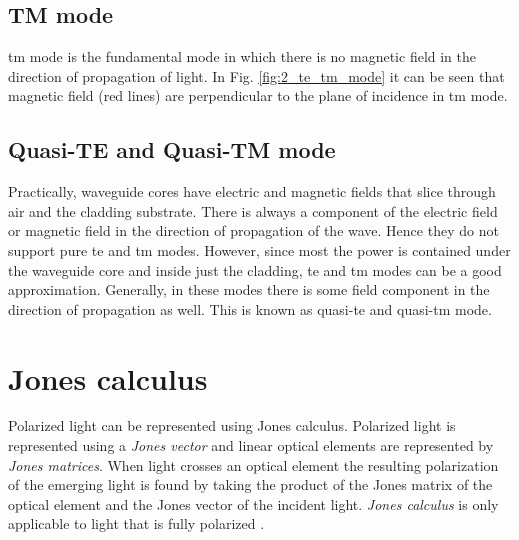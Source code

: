 \documentclass[../report.tex]{subfiles}
\begin{document}
	\subsection{TM mode}
	\gls{tm} mode is the fundamental mode in which there is no magnetic field in the direction of propagation of light. In Fig. \ref{fig:2_te_tm_mode} it can be seen that magnetic field (red lines) are perpendicular to the plane of incidence in \gls{tm} mode.
	
	\subsection{Quasi-TE and Quasi-TM mode}				
	Practically, waveguide cores have electric and magnetic fields that slice through air and the cladding substrate. There is always a component of the electric field or magnetic field in the direction of propagation of the wave. Hence they do not support pure \gls{te} and \gls{tm} modes. However, since most the power is contained under the waveguide core and inside just the cladding, \gls{te} and \gls{tm} modes can be a good approximation. Generally, in these modes there is some field component in the direction of propagation as well. This is known as quasi-\gls{te} and quasi-\gls{tm} mode.

\section{Jones calculus}
Polarized light can be represented using Jones calculus. Polarized light is represented using a \textit{Jones vector} and linear optical elements are represented by \textit{Jones matrices}.	When light crosses an optical element the resulting polarization of the emerging light is found by taking the product of the Jones matrix of the optical element and the Jones vector of the incident light. \textit{Jones calculus} is only applicable to light that is fully polarized \cite{burch_introduction_1975}.
\end{document}
